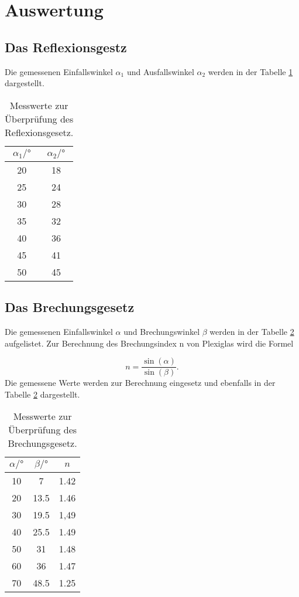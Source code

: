 \section{Auswertung}
\label{sec:Auswertung}

\subsection{Das Reflexionsgestz}
\label{sec:Reflexionsgesetz}

Die gemessenen Einfallswinkel $\alpha_1$ und Ausfallswinkel $\alpha_2$ werden in der Tabelle \ref{tab:Ref} dargestellt.

\begin{table}[H]
  \centering
  \caption{Messwerte zur Überprüfung des Reflexionsgesetz.}
  \label{tab:Ref}
  \begin{tabular}{c c}
    \toprule
    $\alpha_1 /°$ & $\alpha_2 /°$ \\
    \midrule
    20 & 18 \\
    25 & 24 \\
    30 & 28 \\
    35 & 32 \\
    40 & 36 \\
    45 & 41 \\
    50 & 45 \\
    \bottomrule
  \end{tabular}
\end{table}

\subsection{Das Brechungsgesetz}
\label{sec:Brechungsgesetz}

Die gemessenen Einfallswinkel $\alpha$ und Brechungswinkel $\beta$ werden in der Tabelle \ref{tab:Bre} aufgelistet.
Zur Berechnung des Brechungsindex n von Plexiglas wird die Formel

\begin{equation}
  \label{eq:B}
  n = \frac{\sin(\alpha)}{\sin(\beta)}.
\end{equation}
Die gemessene Werte werden zur Berechnung eingesetz und ebenfalls in der Tabelle \ref{tab:Bre} dargestellt.

\begin{table}[H]
  \centering
  \caption{Messwerte zur Überprüfung des Brechungsgesetz.}
  \label{tab:Bre}
  \begin{tabular}{c c c}
    \toprule
    $\alpha /°$ & $\beta /°$ & $n$\\
    \midrule
    10 & 7    & 1.42 \\
    20 & 13.5 & 1.46\\
    30 & 19.5 & 1,49\\
    40 & 25.5 & 1.49\\
    50 & 31   & 1.48\\
    60 & 36   & 1.47\\
    70 & 48.5 & 1.25\\
    \bottomrule
  \end{tabular}
\end{table}

